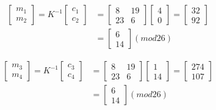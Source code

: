 \documentclass[UTF8]{ctexart}
\begin{document}
\begin{itemize}
\begin{enumerate}
\begin{itemize}
                    $$
                    \begin{aligned}
                        \left[ \begin{array}{c}{m_1}\\ {m_2}\end{array}\right]=K^{-1}\left[ \begin{array}{c}{c_1}\\ {c_2} \end{array}\right]
                                &=\left[ \begin{array}{cc}{8} &{19}\\ {23} &{6}\end{array}\right]\left[ \begin{array}{c}{4}\\ {0} \end{array}\right]
                                    =\left[ \begin{array}{c}{32} \\{92} \end{array}\right]\\
                                        &=\left[ \begin{array}{c}{6} \\{14} \end{array}\right](mod 26)
                    \end{aligned}
                    $$

                    $$
                    \begin{aligned}
                        \left[ \begin{array}{c}{m_3}\\ {m_4}\end{array}\right]=K^{-1}\left[ \begin{array}{c}{c_3}\\ {c_4} \end{array}\right]
                                &=\left[ \begin{array}{cc}{8} &{19}\\ {23} &{6}\end{array}\right]\left[ \begin{array}{c}{1}\\ {14} \end{array}\right]
                                    =\left[ \begin{array}{c}{274} \\{107} \end{array}\right]\\
                                        &=\left[ \begin{array}{c}{6} \\{14} \end{array}\right](mod 26)
                    \end{aligned}
                    $$


\end{itemize}
\end{enumerate}
\end{itemize}
\end{document}
